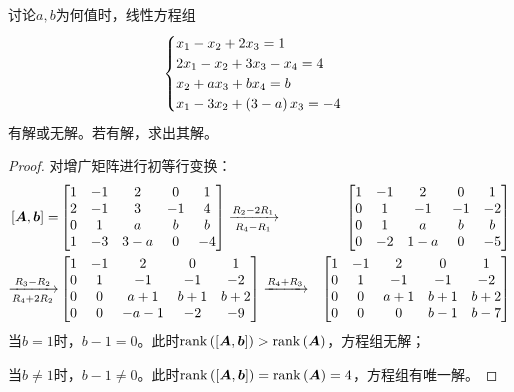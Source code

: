 \begin{problem}\label{problem-2.5}
讨论\(a,b\)为何值时，线性方程组
\begin{equation*}
    \begin{cases}
        x_1-x_2+2x_3=1            \\
        2x_1-x_2+3x_3-x_4=4       \\
        x_2+ax_3+bx_4=b           \\
        x_1-3x_2+\left( 3-a \right)x_3=-4 \\
    \end{cases}
\end{equation*}
有解或无解。若有解，求出其解。
\end{problem}
\begin{proof}
    对增广矩阵进行初等行变换：
    \begin{align*}
        \left[ \boldsymbol{A},\boldsymbol{b} \right]=
         & \begin{bmatrix}
               1 & -1 & 2   & 0  & 1  \\
               2 & -1 & 3   & -1 & 4  \\
               0 & 1  & a   & b  & b  \\
               1 & -3 & 3-a & 0  & -4
           \end{bmatrix}\xrightarrow[R_4-R_1]{R_2-2R_1}
         & \begin{bmatrix}
               1 & -1 & 2   & 0  & 1  \\
               0 & 1  & -1  & -1 & -2 \\
               0 & 1  & a   & b  & b  \\
               0 & -2 & 1-a & 0  & -5
           \end{bmatrix}                       \\
        \xrightarrow[R_4+2R_2]{R_3-R_2}
         & \begin{bmatrix}
               1 & -1 & 2    & 0   & 1   \\
               0 & 1  & -1   & -1  & -2  \\
               0 & 0  & a+1  & b+1 & b+2 \\
               0 & 0  & -a-1 & -2  & -9
           \end{bmatrix}\xrightarrow{R_4+R_3}
         & \begin{bmatrix}
               1 & -1 & 2   & 0   & 1   \\
               0 & 1  & -1  & -1  & -2  \\
               0 & 0  & a+1 & b+1 & b+2 \\
               0 & 0  & 0   & b-1 & b-7
           \end{bmatrix}
    \end{align*}
    当\(b=1\)时，\(b-1=0\)。此时\(\mathrm{rank}\left( \left[ \boldsymbol{A},\boldsymbol{b} \right] \right)>\mathrm{rank}\left( \boldsymbol{A} \right)\)，方程组无解；

    当\(b\neq1\)时，\(b-1\neq0\)。此时\(\mathrm{rank}\left( \left[ \boldsymbol{A},\boldsymbol{b} \right] \right)=\mathrm{rank}\left( \boldsymbol{A} \right)=4\)，方程组有唯一解。

\end{proof}

